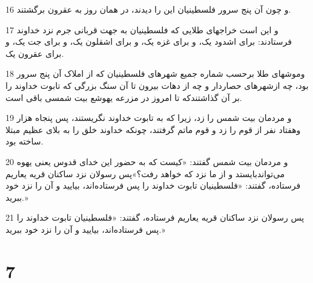 \par 16 و چون آن پنج سرور فلسطینیان این را دیدند، در همان روز به عقرون برگشتند.
\par 17 و این است خراجهای طلایی که فلسطینیان به جهت قربانی جرم نزد خداوند فرستادند: برای اشدود یک، و برای غزه یک، و برای اشقلون یک، و برای جت یک، و برای عقرون یک.
\par 18 وموشهای طلا بر‌حسب شماره جمیع شهرهای فلسطینیان که از املاک آن پنج سرور بود، چه ازشهرهای حصاردار و چه از دهات بیرون تا آن سنگ بزرگی که تابوت خداوند را بر آن گذاشتندکه تا امروز در مزرعه یهوشع بیت شمسی باقی است.
\par 19 و مردمان بیت شمس را زد، زیرا که به تابوت خداوند نگریستند، پس پنجاه هزار وهفتاد نفر از قوم را زد و قوم ماتم گرفتند، چونکه خداوند خلق را به بلای عظیم مبتلا ساخته بود.
\par 20 و مردمان بیت شمس گفتند: «کیست که به حضور این خدای قدوس یعنی یهوه می‌تواندبایستد و از ما نزد که خواهد رفت؟»پس رسولان نزد ساکنان قریه یعاریم فرستاده، گفتند: «فلسطینیان تابوت خداوند را پس فرستاده‌اند، بیایید و آن را نزد خود ببرید.»
\par 21 پس رسولان نزد ساکنان قریه یعاریم فرستاده، گفتند: «فلسطینیان تابوت خداوند را پس فرستاده‌اند، بیایید و آن را نزد خود ببرید.»
 
\chapter{7}

